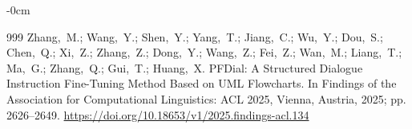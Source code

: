 \documentclass[data,datadescriptor,submit,pdftex,moreauthors]{Definitions/mdpi}
\begin{document}
\begin{adjustwidth}{-\extralength}{0cm}
\begin{thebibliography}{999}
Zhang,~M.; Wang,~Y.; Shen,~Y.; Yang,~T.; Jiang,~C.; Wu,~Y.; Dou,~S.; Chen,~Q.; Xi,~Z.; Zhang,~Z.; Dong,~Y.; Wang,~Z.; Fei,~Z.; Wan,~M.; Liang,~T.; Ma,~G.; Zhang,~Q.; Gui,~T.; Huang,~X. PFDial: A Structured Dialogue Instruction Fine-Tuning Method Based on UML Flowcharts. In Findings of the Association for Computational Linguistics: ACL 2025, Vienna, Austria, 2025; pp. 2626--2649. \url{https://doi.org/10.18653/v1/2025.findings-acl.134}

\end{thebibliography}

\PublishersNote{}
\end{adjustwidth}
\end{document}
